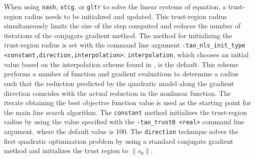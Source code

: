 When using {\tt nash}, {\tt stcg}, or {\tt gltr} to solve the linear systems 
of equation,
a trust-region radius needs to be initialized and updated.  This
trust-region
radius simultaneously limits the size of the step computed and reduces the 
number of iterations of the conjugate gradient method.  The method for 
initializing the trust-region radius is set with the command line argument 
{\tt -tao\_nls\_init\_type <constant,direction,interpolation>};
{\tt interpolation}, which chooses an initial value based on the 
interpolation scheme found in \cite{CGT}, is the default.  This
scheme performs a number of function and gradient evaluations to determine 
a radius such that the reduction predicted by the quadratic model along the 
gradient direction coincides with the actual reduction in the nonlinear 
function.  The iterate obtaining the best objective function value is 
used as the starting point for the main line search algorithm.  The 
{\tt constant} method initializes the trust-region radius by using 
the value specified with the {\tt -tao\_trust0 <real>} command line 
argument, where the default value is 100.  The {\tt direction} technique 
solves the first quadratic optimization problem by using a standard 
conjugate gradient method and initializes the trust region to 
$\|s_0\|$.

